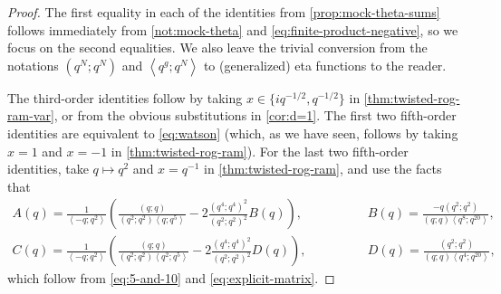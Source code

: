 \documentclass[reqno,11pt]{amsart}
\theoremstyle{definition}
\theoremstyle{remark}
\numberwithin{equation}{section}
\newcommand{\la}{\left\langle}
\newcommand{\ra}{\right\rangle}
\begin{document}
\begin{proof}
The first equality in each of the identities from \cref{prop:mock-theta-sums} follows immediately from \cref{not:mock-theta} and  \cref{eq:finite-product-negative}, so we focus on the second equalities. We also leave the trivial conversion from the notations $\left(q^N; q^N\right)$ and $\la q^g; q^N \ra$ to (generalized) eta functions to the reader.

The third-order identities follow by taking $x \in \{iq^{-1/2}, q^{-1/2}\}$ in \cref{thm:twisted-rog-ram-var}, or from the obvious substitutions in \cref{cor:d=1}. The first two fifth-order identities are equivalent to \cref{eq:watson} (which, as we have seen, follows by taking $x = 1$ and $x = -1$ in \cref{thm:twisted-rog-ram}). For the last two fifth-order identities, take $q \mapsto q^2$ and $x = q^{-1}$ in \cref{thm:twisted-rog-ram}, and use the facts that
\[
\begin{aligned}
    A(q) = 
    \frac{1}{\la -q; q^2\ra}
    \left(\frac{(q; q)}{\left(q^2; q^2\right)\la q; q^5 \ra} 
    - 
    2\frac{\left(q^4; q^4\right)^2}{\left(q^2; q^2\right)^2} B(q)
    \right),&
    \qquad\qquad
    B(q) = \frac{-q\left(q^2; q^2\right)}{(q; q)\la q^8; q^{20} \ra },
    \\
    C(q) = 
    \frac{1}{\la -q; q^2\ra}
    \left(\frac{(q; q)}{\left(q^2; q^2\right)\la q^2; q^5 \ra} 
    - 
    2\frac{\left(q^4; q^4\right)^2}{\left(q^2; q^2\right)^2} D(q)
    \right),&
    \qquad\qquad 
    D(q) = \frac{\left(q^2; q^2\right)}{(q; q)\la q^4; q^{20} \ra},
\end{aligned}
\]
which follow from \cref{eq:5-and-10} and \cref{eq:explicit-matrix}.
\end{proof}
\end{document}

